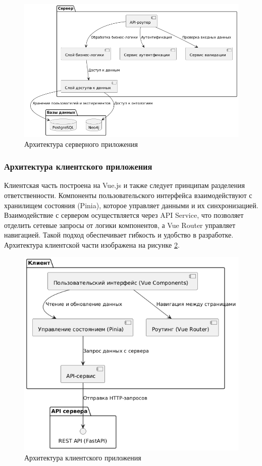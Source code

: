 \begin{figure}[H]
	\centering
	\includegraphics[width=0.7\linewidth]{chapters/img/server_arch.png}
	\caption{Архитектура серверного приложения}
	\label{pic:server_arch}
\end{figure}

\subsubsection{Архитектура клиентского приложения}

Клиентская часть построена на Vue.js и также следует принципам разделения ответственности. Компоненты пользовательского интерфейса взаимодействуют с хранилищем состояния (Pinia\cite{Library:Pinia}), которое управляет данными и их синхронизацией. Взаимодействие с сервером осуществляется через API Service, что позволяет отделить сетевые запросы от логики компонентов, а Vue Router\cite{Library:VueRouter} управляет навигацией. Такой подход обеспечивает гибкость и удобство в разработке. Архитектура клиентской части изображена на рисунке \ref{pic:client_arch}.

\begin{figure}[H]
	\centering
	\includegraphics[width=\linewidth]{chapters/img/client_arch.png}
	\caption{Архитектура клиентского приложения}
	\label{pic:client_arch}
\end{figure}

